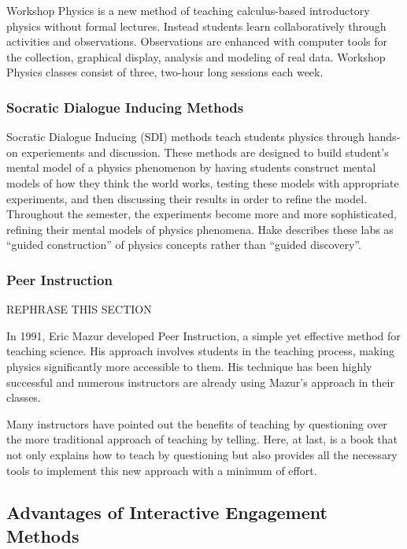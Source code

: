 Workshop Physics is a new method of teaching calculus-based introductory physics without formal lectures. Instead students learn collaboratively through activities and observations. Observations are enhanced with computer tools for the collection, graphical display, analysis and modeling of real data. Workshop Physics classes consist of three, two-hour long sessions each week.

\subsubsection{Socratic Dialogue Inducing Methods}

Socratic Dialogue Inducing (SDI) methods teach students physics through hands-on experiements and discussion. These methods are designed to build student's mental model of a physics phenomenon by having students construct mental models of how they think the world works, testing these models with appropriate experiments, and then discussing their results in order to refine the model. Throughout the semester, the experiments become more and more sophisticated, refining their mental models of physics phenomena. Hake describes these labs as ``guided construction'' of physics concepts rather than ``guided discovery''\cite{hake1992}.

\subsubsection{Peer Instruction}

REPHRASE THIS SECTION

In 1991, Eric Mazur developed Peer Instruction, a simple yet effective method for teaching science. His approach involves students in the teaching process, making physics significantly more accessible to them. His technique has been highly successful and numerous instructors are already using Mazur's approach in their classes.

Many instructors have pointed out the benefits of teaching by questioning over the more traditional approach of teaching by telling. Here, at last, is a book that not only explains how to teach by questioning but also provides all the necessary tools to implement this new approach with a minimum of effort\cite{mazur1997}.

\subsection{Advantages of Interactive Engagement Methods}

